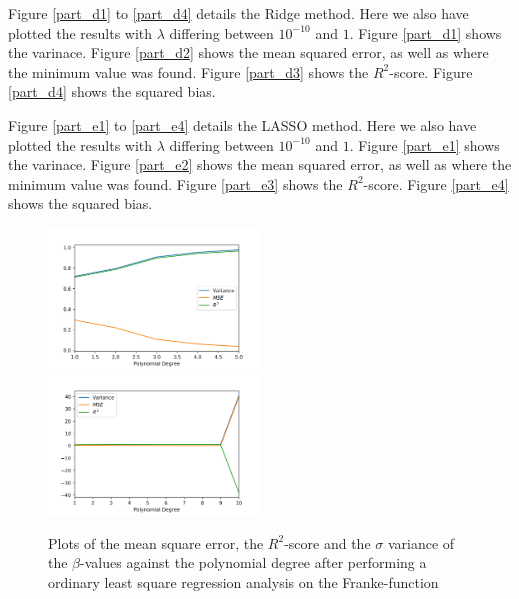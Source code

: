 \documentclass[a4paper,10pt,english]{article}
\begin{document}
Figure \ref{part_d1} to \ref{part_d4} details the Ridge method. Here we also have plotted the results with $\lambda$ differing between $10^{-10}$ and $1$.
Figure \ref{part_d1} shows the varinace.
Figure \ref{part_d2} shows the mean squared error, as well as where the minimum value was found.
Figure \ref{part_d3} shows the $R^2$-score.
Figure \ref{part_d4} shows the squared bias. 

Figure \ref{part_e1} to \ref{part_e4} details the LASSO method. Here we also have plotted the results with $\lambda$ differing between $10^{-10}$ and $1$.
Figure \ref{part_e1} shows the varinace.
Figure \ref{part_e2} shows the mean squared error, as well as where the minimum value was found.
Figure \ref{part_e3} shows the $R^2$-score.
Figure \ref{part_e4} shows the squared bias. 




\begin{figure}[H]
	\centering 
	\includegraphics[width = 0.5\textwidth, center]{../franke_output/part_A.png}
	\includegraphics[width = 0.5\textwidth, center]{../franke_output/part_A_highdeg.png}
	\caption{
		Plots of the mean square error, the $R^2$-score and the $\sigma$ variance of the $\beta$-values against the polynomial degree after performing a ordinary least square regression analysis on the Franke-function
	}
	\label{part_a}
\end{figure}
\end{document}
